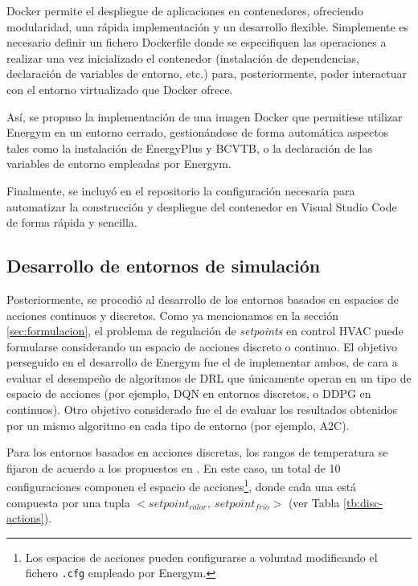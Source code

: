 Docker permite el despliegue de aplicaciones en contenedores, ofreciendo modularidad, una rápida implementación y un desarrollo flexible. Simplemente es necesario definir un fichero Dockerfile donde se especifiquen las operaciones a realizar una vez inicializado el contenedor (instalación de dependencias, declaración de variables de entorno, etc.) para, posteriormente, poder interactuar con el entorno virtualizado que Docker ofrece.
    
Así, se propuso la implementación de una imagen Docker que permitiese utilizar Energym en un entorno cerrado, gestionándose de forma automática aspectos tales como la instalación de EnergyPlus y BCVTB, o la declaración de las variables de entorno empleadas por Energym. 
    
Finalmente, se incluyó en el repositorio la configuración necesaria para automatizar la construcción y despliegue del contenedor en Visual Studio Code de forma rápida y sencilla.

\subsection{Desarrollo de entornos de simulación}
\label{sec:entornos}
    
Posteriormente, se procedió al desarrollo de los entornos basados en espacios de acciones continuos y discretos. Como ya mencionamos en la sección \ref{sec:formulacion}, el problema de regulación de \textit{setpoints} en control HVAC puede formularse considerando un espacio de acciones discreto o continuo. El objetivo perseguido en el desarrollo de Energym fue el de implementar ambos, de cara a evaluar el desempeño de algoritmos de DRL que únicamente operan en un tipo de espacio de acciones (por ejemplo, DQN en entornos discretos, o DDPG en continuos). Otro objetivo considerado fue el de evaluar los resultados obtenidos por un mismo algoritmo en cada tipo de entorno (por ejemplo, A2C).
    
Para los entornos basados en acciones discretas, los rangos de temperatura se fijaron de acuerdo a los propuestos en \cite{center2013determining}. En este caso, un total de 10 configuraciones componen el espacio de acciones\footnote{Los espacios de acciones pueden configurarse a voluntad modificando el fichero \texttt{.cfg} empleado por Energym.}, donde cada una está compuesta por una tupla $<setpoint_{calor},\ setpoint_{frio}>$ (ver Tabla \ref{tb:disc-actions}).
    
